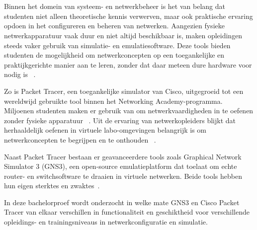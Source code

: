 
\chapter{}%
\label{ch:inleiding}

Binnen het domein van systeem- en netwerkbeheer is het van belang dat studenten niet alleen theoretische kennis verwerven, maar ook praktische ervaring opdoen in het configureren en beheren van netwerken. Aangezien fysieke netwerkapparatuur vaak duur en niet altijd beschikbaar is, maken opleidingen steeds vaker gebruik van simulatie- en emulatiesoftware. Deze tools bieden studenten de mogelijkheid om netwerkconcepten op een toegankelijke en praktijkgerichte manier aan te leren, zonder dat daar meteen dure hardware voor nodig is ~\autocite{Gomez2023}.

\vspace{0.3cm}

Zo is Packet Tracer, een toegankelijke simulator van Cisco, uitgegroeid tot een wereldwijd gebruikte tool binnen het Networking Academy-programma. Miljoenen studenten maken er gebruik van om netwerkvaardigheden in te oefenen zonder fysieke apparatuur ~\autocite{ciscoP}. Uit de ervaring van netwerkopleiders blijkt dat herhaaldelijk oefenen in virtuele labo-omgevingen belangrijk is om netwerkconcepten te begrijpen en te onthouden ~\autocite{Maes2022}.

\vspace{0.5cm}

Naast Packet Tracer bestaan er geavanceerdere tools zoals Graphical Network Simulator 3 (GNS3), een open-source emulatieplatform dat toelaat om echte router- en switchsoftware te draaien in virtuele netwerken. Beide tools hebben hun eigen sterktes en zwaktes~\autocite{gns3_doc2025}.

\vspace{0.3cm}

In deze bachelorproef wordt onderzocht in welke mate GNS3 en Cisco Packet Tracer van elkaar verschillen in functionaliteit en geschiktheid voor verschillende opleidings- en trainingsniveaus in netwerkconfiguratie en simulatie.



\section{}%
\label{sec:probleemstelling}

